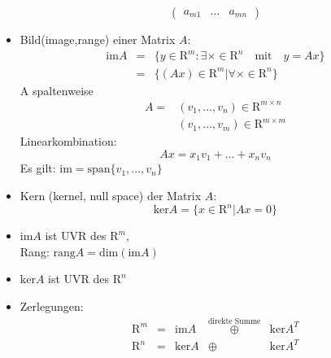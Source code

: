 \documentclass[ngerman]{tudscrreprt}
\begin{document}
\begin{itemize}
\begin{equation*}
\begin{pmatrix}
a_{m1} &\dots &a_{mn}
\end{pmatrix}
\end{equation*}
\item Bild(image,range) einer Matrix $A$:
\begin{equation*}
\begin{matrix}
\text{im}A &=& \{y\in \mathrm{R}^m : \exists \times \in \mathrm{R}^n \quad \text{mit}\quad y= Ax \} \\ 
&=& \{ (Ax)\in \mathrm{R}^m |\forall \times \in \mathrm{R}^n \}
\end{matrix}
\end{equation*}
A spaltenweise
\begin{align*}
A =& (v_1 ,\dots, v_n )\in \mathrm{R}^{m\times n}\\
 &(v_1 ,\dots, v_m )\in \mathrm{R}^{m\times m}
\end{align*}
Linearkombination: 
\begin{equation*}
Ax= x_1 v_1 + \dots + x_n v_n 
\end{equation*}
Es gilt: $\text{im} = \text{span}\{ v_1, \dots , v_n \}$ 

\item Kern (kernel, null space) der Matrix $A$:
\begin{equation*}
\text{ker}A = \{ x\in \mathrm{R}^n | Ax = 0 \}
\end{equation*}
\item $\text{im}A$ ist UVR des $\mathrm{R}^m$, \\ 
Rang: $\text{rang} A = \text{dim}(\text{im}A)$
\item $\text{ker}A$ ist UVR des $\mathrm{R}^n$
\item Zerlegungen: 
\begin{equation*}
\begin{matrix}
\mathrm{R}^m &=& \text{im}A &\overset{\text{direkte Summe}}{\oplus} &\text{ker} A^T \\ 
\mathrm{R}^n &=& \text{ker}A& \oplus &\text{ker} A^T 
\end{matrix}
\end{equation*}



\end{itemize}
\end{document}
